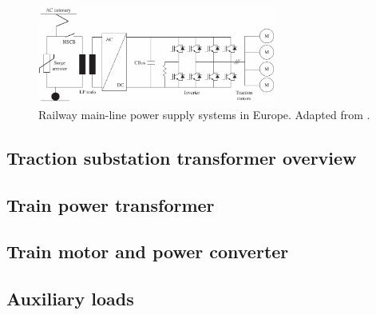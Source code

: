\begin{figure}[h!]
	\centering
	\includegraphics[width=0.7\textwidth,keepaspectratio]{figures/31.PowerS/abad2016g}
	\caption{Railway main-line power supply systems in Europe. Adapted from \cite{abad2016}.}
	\label{fig:abad2016g}
\end{figure}


\subsection{Traction substation transformer overview}

\subsection{Train power transformer}

\subsection{Train motor and power converter}

\subsection{Auxiliary loads}